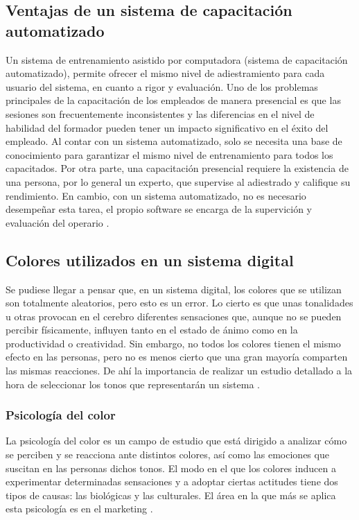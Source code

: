 \subsection{Ventajas de un sistema de capacitación automatizado}
Un sistema de entrenamiento asistido por computadora (sistema de capacitación automatizado), permite ofrecer el mismo nivel de adiestramiento para cada usuario del sistema, en cuanto a rigor y evaluación. Uno de los problemas principales de la capacitación de los empleados de manera presencial es que las sesiones son frecuentemente inconsistentes y las diferencias en el nivel de habilidad del formador pueden tener un impacto significativo en el éxito del empleado. Al contar con un sistema automatizado, solo se necesita una base de conocimiento para garantizar el mismo nivel de entrenamiento para todos los capacitados. Por otra parte, una capacitación presencial requiere la existencia de una persona, por lo general un experto, que supervise al adiestrado y califique su rendimiento. En cambio, con un sistema automatizado, no es necesario desempeñar esta tarea, el propio software se encarga de la supervición y evaluación del operario \cite{Kanev2017}.

\subsection{Colores utilizados en un sistema digital}
Se pudiese llegar a pensar que, en un sistema digital, los colores que se utilizan son totalmente aleatorios, pero esto es un error. Lo cierto es que unas tonalidades u otras provocan en el cerebro diferentes sensaciones que, aunque no se pueden percibir físicamente, influyen tanto en el estado de ánimo como en la productividad o creatividad. Sin embargo, no todos los colores tienen el mismo efecto en las personas, pero no es menos cierto que una gran mayoría comparten las mismas reacciones. De ahí la importancia de realizar un estudio detallado a la hora de seleccionar los tonos que representarán un sistema \cite{Paspuezan2022}.

\subsubsection{Psicología del color}
La psicología del color es un campo de estudio que está dirigido a analizar cómo se perciben y se reacciona ante distintos colores, así como las emociones que suscitan en las personas dichos tonos. El modo en el que los colores inducen a experimentar determinadas sensaciones y a adoptar ciertas actitudes tiene dos tipos de causas: las biológicas y las culturales. El área en la que más se aplica esta psicología es en el marketing \cite{Paspuezan2022}.


